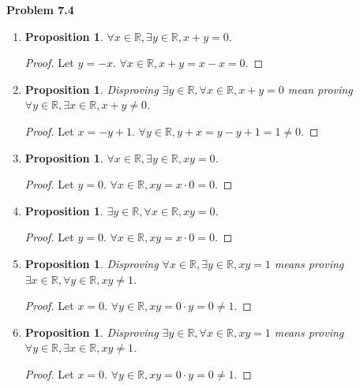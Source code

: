 \documentclass{article}
\newtheorem{prop}[thm]{Proposition}
\begin{document}
\textbf{Problem 7.4}
\begin{enumerate}[label={(\roman*)}]
    \item 
    \begin{prop}
        $\forall x \in \mathbb{R}, \exists y \in \mathbb{R}, x + y = 0$.
    \end{prop}
    \begin{proof}
        Let $y = -x$. $\forall x\in \mathbb{R}, x + y = x - x = 0$.
    \end{proof}

    \item 
    \begin{prop}
        Disproving $\exists y \in \mathbb{R}, \forall x \in \mathbb{R}, x + y=0$ mean proving $\forall y \in \mathbb{R}, \exists x \in \mathbb{R}, x + y \neq 0$.
    \end{prop}
    \begin{proof}
        Let $x = -y + 1$. $\forall y \in \mathbb{R}, y + x = y - y + 1 = 1 \neq 0$.
    \end{proof}

    \item 
    \begin{prop}
        $\forall x \in \mathbb{R}, \exists y \in \mathbb{R}, xy=0$.
    \end{prop}
    \begin{proof}
        Let $y = 0$. $\forall x \in \mathbb{R}, xy = x \cdot 0 = 0$.
    \end{proof}

    \item 
    \begin{prop}
        $\exists y \in \mathbb{R}, \forall x \in \mathbb{R}, xy = 0$.
    \end{prop}
    \begin{proof}
        Let $y = 0$. $\forall x \in \mathbb{R}, xy = x \cdot 0 = 0$.
    \end{proof}

    \item 
    \begin{prop}
        Disproving $\forall x \in \mathbb{R}, \exists y \in \mathbb{R}, xy = 1$ means proving $\exists x \in \mathbb{R}, \forall y \in \mathbb{R}, xy \neq 1$.
    \end{prop}
    \begin{proof}
        Let $x = 0$. $\forall y \in \mathbb{R}, xy = 0 \cdot y = 0 \neq 1$.
    \end{proof}

    \item 
    \begin{prop}
        Disproving $\exists y \in \mathbb{R}, \forall x \in \mathbb{R}, xy =1$ means proving $\forall y \in \mathbb{R}, \exists x \in \mathbb{R}, xy \neq 1$.
    \end{prop}
    \begin{proof}
        Let $x = 0$. $\forall y \in \mathbb{R}, xy = 0 \cdot y = 0 \neq 1$.
    \end{proof}


\end{enumerate}
\end{document}
